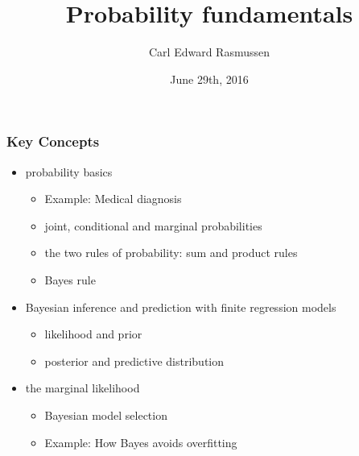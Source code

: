 

\title{Probability fundamentals}
\author{Carl Edward Rasmussen}
\date{June 29th, 2016}



\begin{frame}
\titlepage
\end{frame}

\begin{frame}
\frametitle{Key Concepts}

\begin{itemize}
\item probability basics
\begin{itemize}
\item Example: Medical diagnosis
\item joint, conditional and marginal probabilities
\item the two rules of probability: sum and product rules
\item Bayes rule
\end{itemize}
\item Bayesian inference and prediction with finite regression models
\begin{itemize}
\item likelihood and prior
\item posterior and predictive distribution
\end{itemize}
\item the marginal likelihood
\begin{itemize}
\item Bayesian model selection
\item Example: How Bayes avoids overfitting
\end{itemize}
\end{itemize}
\end{frame}


